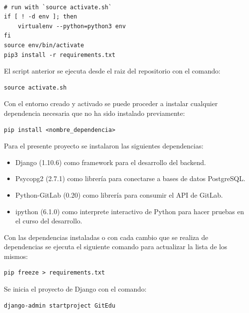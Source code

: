 \begin{lstlisting}

# run with `source activate.sh` 
if [ ! -d env ]; then
	virtualenv --python=python3 env
fi
source env/bin/activate
pip3 install -r requirements.txt

\end{lstlisting}

El script anterior se ejecuta desde el raiz del repositorio con el comando:

\begin{lstlisting}
source activate.sh
\end{lstlisting}

Con el entorno creado y activado se puede proceder a instalar cualquier dependencia necesaria que no ha sido instalado previamente:

\begin{lstlisting}
pip install <nombre_dependencia>
\end{lstlisting}

Para el presente proyecto se instalaron las siguientes dependencias:
\begin{itemize}
	\item Django (1.10.6) como framework para el desarrollo del backend.
    \item Psycopg2 (2.7.1) como librería para conectarse a bases de datos PostgreSQL.
    \item Python-GitLab (0.20) como librería para consumir el API de GitLab.
    \item ipython (6.1.0) como interprete interactivo de Python para hacer pruebas en el curso del desarrollo.
\end{itemize}

Con las dependencias instaladas o con cada cambio que se realiza de dependencias se ejecuta el siguiente comando para actualizar la lista de los mismos:

\begin{lstlisting}
pip freeze > requirements.txt
\end{lstlisting}

Se inicia el proyecto de Django con el comando:

\begin{lstlisting}
django-admin startproject GitEdu
\end{lstlisting}

